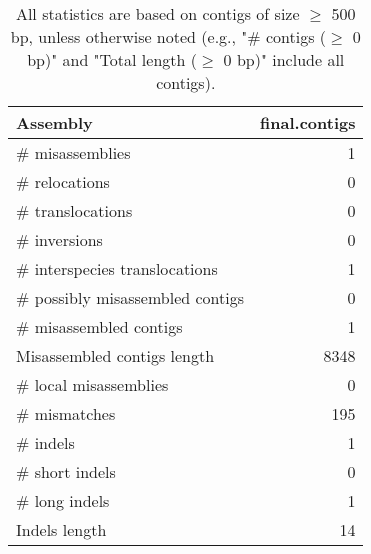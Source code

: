 \documentclass[12pt,a4paper]{article}
\begin{document}
\begin{table}[ht]
\begin{center}
\caption{All statistics are based on contigs of size $\geq$ 500 bp, unless otherwise noted (e.g., "\# contigs ($\geq$ 0 bp)" and "Total length ($\geq$ 0 bp)" include all contigs).}
\begin{tabular}{|l*{1}{|r}|}
\hline
Assembly & final.contigs \\ \hline
\# misassemblies & 1 \\ \hline
\hspace{5mm}\# relocations & 0 \\ \hline
\hspace{5mm}\# translocations & 0 \\ \hline
\hspace{5mm}\# inversions & 0 \\ \hline
\hspace{5mm}\# interspecies translocations & 1 \\ \hline
\# possibly misassembled contigs & 0 \\ \hline
\# misassembled contigs & 1 \\ \hline
Misassembled contigs length & 8348 \\ \hline
\# local misassemblies & 0 \\ \hline
\# mismatches & 195 \\ \hline
\# indels & 1 \\ \hline
\hspace{5mm}\# short indels & 0 \\ \hline
\hspace{5mm}\# long indels & 1 \\ \hline
Indels length & 14 \\ \hline
\end{tabular}
\end{center}
\end{table}
\end{document}
